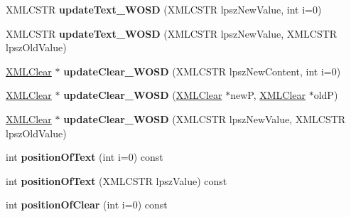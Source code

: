 \begin{DoxyCompactItemize}
\item 
X\+M\+L\+C\+S\+TR {\bfseries update\+Text\+\_\+\+W\+O\+SD} (X\+M\+L\+C\+S\+TR lpsz\+New\+Value, int i=0)\hypertarget{struct_x_m_l_node_adcff1825b8c39743e35df76db9d0a72d}{}\label{struct_x_m_l_node_adcff1825b8c39743e35df76db9d0a72d}

\item 
X\+M\+L\+C\+S\+TR {\bfseries update\+Text\+\_\+\+W\+O\+SD} (X\+M\+L\+C\+S\+TR lpsz\+New\+Value, X\+M\+L\+C\+S\+TR lpsz\+Old\+Value)\hypertarget{struct_x_m_l_node_a79d26f52b800cb5f413cda3b08c4b89b}{}\label{struct_x_m_l_node_a79d26f52b800cb5f413cda3b08c4b89b}

\item 
\hyperlink{struct_x_m_l_clear}{X\+M\+L\+Clear} $\ast$ {\bfseries update\+Clear\+\_\+\+W\+O\+SD} (X\+M\+L\+C\+S\+TR lpsz\+New\+Content, int i=0)\hypertarget{struct_x_m_l_node_a70340d5baee0f1789149b459c9861b03}{}\label{struct_x_m_l_node_a70340d5baee0f1789149b459c9861b03}

\item 
\hyperlink{struct_x_m_l_clear}{X\+M\+L\+Clear} $\ast$ {\bfseries update\+Clear\+\_\+\+W\+O\+SD} (\hyperlink{struct_x_m_l_clear}{X\+M\+L\+Clear} $\ast$newP, \hyperlink{struct_x_m_l_clear}{X\+M\+L\+Clear} $\ast$oldP)\hypertarget{struct_x_m_l_node_a25a713d21457706eabd8658bbce0b180}{}\label{struct_x_m_l_node_a25a713d21457706eabd8658bbce0b180}

\item 
\hyperlink{struct_x_m_l_clear}{X\+M\+L\+Clear} $\ast$ {\bfseries update\+Clear\+\_\+\+W\+O\+SD} (X\+M\+L\+C\+S\+TR lpsz\+New\+Value, X\+M\+L\+C\+S\+TR lpsz\+Old\+Value)\hypertarget{struct_x_m_l_node_a0b46f3ed1681e355e30120c43c410767}{}\label{struct_x_m_l_node_a0b46f3ed1681e355e30120c43c410767}

\item 
int {\bfseries position\+Of\+Text} (int i=0) const \hypertarget{struct_x_m_l_node_a657d90f38bb2aaef1ee24223cfb51c4d}{}\label{struct_x_m_l_node_a657d90f38bb2aaef1ee24223cfb51c4d}

\item 
int {\bfseries position\+Of\+Text} (X\+M\+L\+C\+S\+TR lpsz\+Value) const \hypertarget{struct_x_m_l_node_af139bdb71e4a3f223d110dca542693f9}{}\label{struct_x_m_l_node_af139bdb71e4a3f223d110dca542693f9}

\item 
int {\bfseries position\+Of\+Clear} (int i=0) const \hypertarget{struct_x_m_l_node_a76f07122a71451d0cdcf7e277b447ad3}{}\label{struct_x_m_l_node_a76f07122a71451d0cdcf7e277b447ad3}


\end{DoxyCompactItemize}
